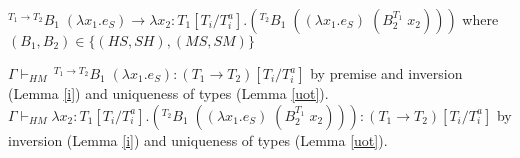 \begin{case}
$^{T_{1}\rightarrow T_{2}}B_{1}\;(\lambda x_{1}.e_{S})\rightarrow\lambda x_{2}:T_{1}[T_{i}/T_{i}^{a}].(^{T_{2}}B_{1}\;((\lambda x_{1}.e_{S})\;(B_{2}^{T_{1}}\;x_{2})))$ where $(B_{1},B_{2})\in\lbrace(HS,SH),(MS,SM)\rbrace$

$\Gamma\vdash_{HM}\,^{T_{1}\rightarrow T_{2}}B_{1}\;(\lambda x_{1}.e_{S}):(T_{1}\rightarrow T_{2})[T_{i}/T_{i}^{a}]$ by premise and inversion (Lemma \ref{i}) and uniqueness of types (Lemma \ref{uot}).  $\Gamma\vdash_{HM}\lambda x_{2}:T_{1}[T_{i}/T_{i}^{a}].(^{T_{2}}B_{1}\;((\lambda x_{1}.e_{S})\;(B_{2}^{T_{1}}\;x_{2}))):(T_{1}\rightarrow T_{2})[T_{i}/T_{i}^{a}]$ by inversion (Lemma \ref{i}) and uniqueness of types (Lemma \ref{uot}).
\end{case}